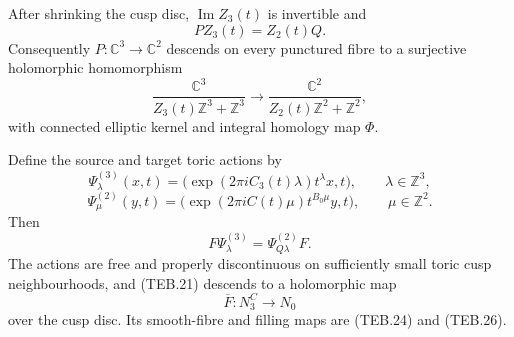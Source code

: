 \begin{theorem}
\label{thm:teb-holomorphic-cusp-bridge}
After shrinking the cusp disc, \(\operatorname{Im}Z_3(t)\) is invertible and
\[
 PZ_3(t)=Z_2(t)Q.                                      \tag{TEB.30}
\]
Consequently \(P:\mathbb C^3\to\mathbb C^2\) descends on every punctured
fibre to a surjective holomorphic homomorphism
\[
 \frac{\mathbb C^3}{Z_3(t)\mathbb Z^3+\mathbb Z^3}
 \longrightarrow
 \frac{\mathbb C^2}{Z_2(t)\mathbb Z^2+\mathbb Z^2},    \tag{TEB.31}
\]
with connected elliptic kernel and integral homology map \(\Phi\).

Define the source and target toric actions by
\[
 \Psi^{(3)}_\lambda(x,t)=
 \bigl(\exp(2\pi iC_3(t)\lambda)t^\lambda x,t\bigr),
 \qquad \lambda\in\mathbb Z^3,                         \tag{TEB.32}
\]
\[
 \Psi^{(2)}_\mu(y,t)=
 \bigl(\exp(2\pi iC(t)\mu)t^{B_0\mu}y,t\bigr),
 \qquad \mu\in\mathbb Z^2.                            \tag{TEB.33}
\]
Then
\[
 F\Psi^{(3)}_\lambda=\Psi^{(2)}_{Q\lambda}F.          \tag{TEB.34}
\]
The actions are free and properly discontinuous on sufficiently small toric
cusp neighbourhoods, and (TEB.21) descends to a holomorphic map
\[
 \overline F:N_3^C\longrightarrow N_0                 \tag{TEB.35}
\]
over the cusp disc.  Its smooth-fibre and filling maps are (TEB.24) and
(TEB.26).
\end{theorem}

